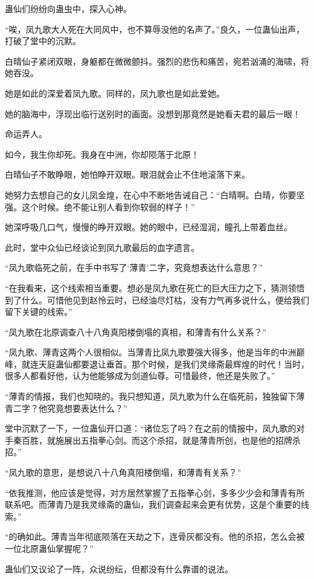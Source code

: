\begin{this_body}
蛊仙们纷纷向蛊虫中，探入心神。

“唉，凤九歌大人死在大同风中，也不算辱没他的名声了。”良久，一位蛊仙出声，打破了堂中的沉默。

白晴仙子紧闭双眼，身躯都在微微颤抖。强烈的悲伤和痛苦，宛若汹涌的海啸，将她吞没。

她是如此的深爱着凤九歌。同样的，凤九歌也是如此爱她。

她的脑海中，浮现出临行送别时的画面。没想到那竟然是她看夫君的最后一眼！

命运弄人。

如今，我生你却死。我身在中洲，你却陨落于北原！

白晴仙子不敢睁眼，她怕睁开双眼。眼泪就会止不住地滚落下来。

她努力去想自己的女儿凤金煌，在心中不断地告诫自己：“白晴啊。白晴，你要坚强。这个时候。绝不能让别人看到你软弱的样子！”

她深呼吸几口气，慢慢的睁开双眼。她的眼中，已经湿润，瞳孔上带着血丝。

此时，堂中众仙已经谈论到凤九歌最后的血字遗言。

“凤九歌临死之前，在手中书写了‘薄青’二字，究竟想表达什么意思？”

“在我看来，这个线索相当重要。想必是凤九歌在死亡的巨大压力之下，猜测领悟到了什么。可惜他见到赵怜云时，已经油尽灯枯，没有力气再多说什么，便给我们留下关键的线索。”

“凤九歌在北原调查八十八角真阳楼倒塌的真相，和薄青有什么关系？”

“凤九歌、薄青这两个人很相似。当薄青比凤九歌要强大得多，他是当年的中洲巅峰，就连天庭蛊仙都要退让垂首。那个时候，是我们灵缘斋最辉煌的时代！当时，很多人都看好他，认为他能够成为剑道仙尊。可惜最终，他还是失败了。”

“薄青的情报，我们也知晓的。我只想知道，凤九歌为什么在临死前，独独留下薄青二字？他究竟想要表达什么？”

堂中沉默了一下，一位蛊仙开口道：“诸位忘了吗？在之前的情报中，凤九歌的对手秦百胜，就施展出五指拳心剑。而这个杀招，就是薄青所创，也是他的招牌杀招。”

“凤九歌的意思，是想说八十八角真阳楼倒塌，和薄青有关系？”

“依我推测，他应该是觉得，对方居然掌握了五指拳心剑，多多少少会和薄青有所联系吧。而薄青乃是我灵缘斋的蛊仙，我们调查起来会更有优势，这是个重要的线索。”

“的确如此。薄青当年彻底陨落在天劫之下，连骨灰都没有。他的杀招，怎么会被一位北原蛊仙掌握呢？”

蛊仙们又议论了一阵，众说纷纭，但都没有什么靠谱的说法。


\end{this_body}

